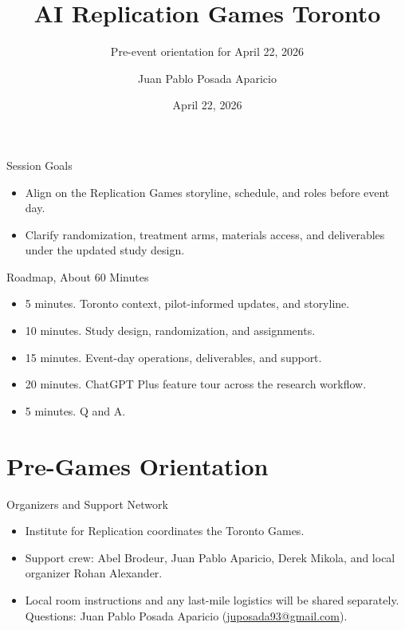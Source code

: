 \documentclass[aspectratio=169,professionalfonts]{beamer}
\title{AI Replication Games Toronto}
\subtitle{Pre-event orientation for April 22, 2026}
\author{Juan Pablo Posada Aparicio}
\institute{Institute for Replication}
\date{April 22, 2026}
\begin{document}
\begin{frame}
  \titlepage
\end{frame}

\begin{frame}{Session Goals}
  \begin{itemize}
    \item Align on the Replication Games storyline, schedule, and roles before event day.
    \item Clarify randomization, treatment arms, materials access, and deliverables under the updated study design.
  \end{itemize}
\end{frame}

\begin{frame}{Roadmap, About 60 Minutes}
  \begin{itemize}
    \item 5 minutes. Toronto context, pilot-informed updates, and storyline.
    \item 10 minutes. Study design, randomization, and assignments.
    \item 15 minutes. Event-day operations, deliverables, and support.
    \item 20 minutes. ChatGPT Plus feature tour across the research workflow.
    \item 5 minutes. Q and A.

  \end{itemize}
\end{frame}

\section{Pre-Games Orientation}

\begin{frame}{Organizers and Support Network}
  \begin{itemize}
    \item Institute for Replication coordinates the Toronto Games.
    \item Support crew: Abel Brodeur, Juan Pablo Aparicio, Derek Mikola, and local organizer Rohan Alexander.
    \item Local room instructions and any last-mile logistics will be shared separately. Questions: Juan Pablo Posada Aparicio (\href{mailto:juposada93@gmail.com}{juposada93@gmail.com}).
  \end{itemize}
\end{frame}
\end{document}
